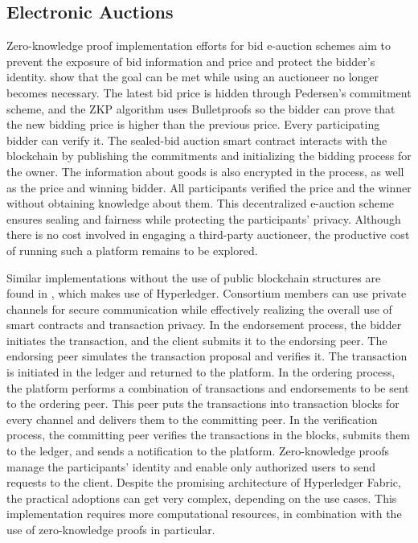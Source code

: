 \subsection{Electronic Auctions}
Zero-knowledge proof implementation efforts for bid e-auction schemes aim to prevent the exposure of bid information and price and protect the bidder's identity. \citet{LiXue} show that the goal can be met while using an auctioneer no longer becomes necessary. The latest bid price is hidden through Pedersen's commitment scheme, and the ZKP algorithm uses Bulletproofs so the bidder can prove that the new bidding price is higher than the previous price. Every participating bidder can verify it. The sealed-bid auction smart contract interacts with the blockchain by publishing the commitments and initializing the bidding process for the owner. The information about goods is also encrypted in the process, as well as the price and winning bidder. All participants verified the price and the winner without obtaining knowledge about them. This decentralized e-auction scheme ensures sealing and fairness while protecting the participants' privacy. Although there is no cost involved in engaging a third-party auctioneer, the productive cost of running such a platform remains to be explored.

Similar implementations without the use of public blockchain structures are found in \citet{WangZhaoMu}, which makes use of Hyperledger. Consortium members can use private channels for secure communication while effectively realizing the overall use of smart contracts and transaction privacy. In the endorsement process, the bidder initiates the transaction, and the client submits it to the endorsing peer. The endorsing peer simulates the transaction proposal and verifies it. The transaction is initiated in the ledger and returned to the platform. In the ordering process, the platform performs a combination of transactions and endorsements to be sent to the ordering peer. This peer puts the transactions into transaction blocks for every channel and delivers them to the committing peer. In the verification process, the committing peer verifies the transactions in the blocks, submits them to the ledger, and sends a notification to the platform. Zero-knowledge proofs manage the participants' identity and enable only authorized users to send requests to the client. Despite the promising architecture of Hyperledger Fabric, the practical adoptions can get very complex, depending on the use cases. This implementation requires more computational resources, in combination with the use of zero-knowledge proofs in particular.

